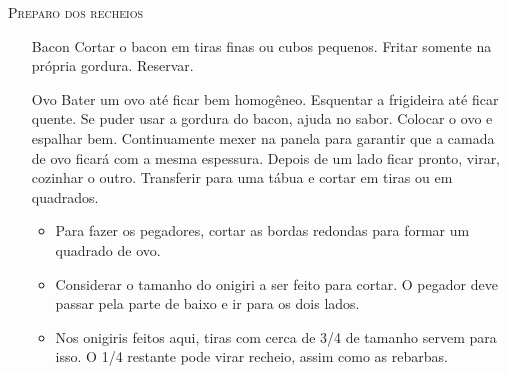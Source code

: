 {	\textsc{Preparo dos recheios}
	\begin{enumerate}
		\item[Bacon] Cortar o bacon em tiras finas ou cubos pequenos. Fritar somente
		      na própria gordura. Reservar.
		\item[Ovo] Bater um ovo até ficar bem homogêneo. Esquentar a frigideira até
		      ficar quente. Se puder usar a gordura do bacon, ajuda no sabor. Colocar o
		      ovo e espalhar bem. Continuamente mexer na panela para garantir que a
		      camada de ovo ficará com a mesma espessura. Depois de um lado ficar
		      pronto, virar, cozinhar o outro. Transferir para uma tábua e cortar em
		      tiras ou em quadrados.
		      \begin{itemize}
			      \item Para fazer os pegadores, cortar as bordas redondas para formar
			            um quadrado de ovo.
			      \item Considerar o tamanho do onigiri a ser feito para cortar. O
			            pegador deve passar pela parte de baixo e ir para os dois lados.
			      \item Nos onigiris feitos aqui, tiras com cerca de 3/4 de tamanho
			            servem para isso. O 1/4 restante pode virar recheio, assim como as
			            rebarbas.
		      \end{itemize}
	\end{enumerate}

}



